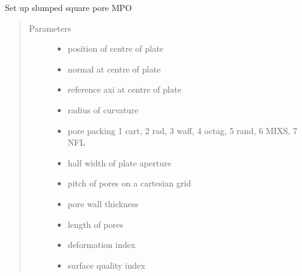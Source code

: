 \documentclass[letterpaper,10pt,english]{sphinxmanual}
\begin{document}
\begin{fulllineitems}
\label{\detokenize{xsrt_functions:xsrt.sqpore}}
Set up slumped square pore MPO
\begin{quote}\begin{description}
\item[{Parameters}] \leavevmode\begin{itemize}
\item {} 
 \textendash{} position of centre of plate

\item {} 
 \textendash{} normal at centre of plate

\item {} 
 \textendash{} reference axi at centre of plate

\item {} 
 \textendash{} radius of curvature

\item {} 
 \textendash{} pore packing
1 cart, 2 rad, 3 waff, 4 octag, 5 rand, 6 MIXS, 7 NFL

\item {} 
 \textendash{} half width of plate aperture

\item {} 
 \textendash{} pitch of pores on a cartesian grid

\item {} 
 \textendash{} pore wall thickness

\item {} 
 \textendash{} length of pores

\item {} 
 \textendash{} deformation index

\item {} 
 \textendash{} surface quality index


\end{itemize}
\end{description}
\end{quote}
\end{fulllineitems}
\end{document}
